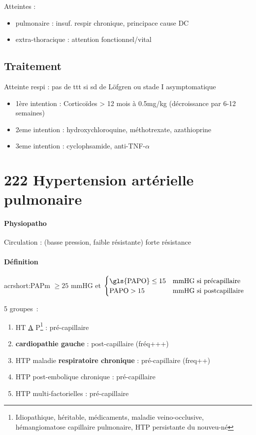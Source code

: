 \documentclass{book}
\begin{document}
Atteintes :

\begin{itemize}
\item pulmonaire : insuf. respir chronique, principace cause DC
\item extra-thoracique : attention fonctionnel/vital
\end{itemize}


\subsection{Traitement}
\label{sec:orge3c5ab7}
\label{sec:orgc05b9f6}
Atteinte respi : pas de ttt si sd de Löfgren ou stade I asymptomatique\\

\begin{itemize}
\item 1ère intention : Corticoïdes > 12 mois à 0.5mg/kg (décroissance par 6-12 semaines)
\item 2eme intention : hydroxychloroquine, méthotrexate, azathioprine
\item 3eme intention : cyclophsamide, anti-TNF-\(\alpha\)
\end{itemize}

\section{222 \textdagger{} Hypertension artérielle pulmonaire}
\label{sec:org100a033}

\paragraph{Physiopatho}
\label{sec:org37656dd}
Circulation : (basse pression, faible résistante) \thus forte résistance

\paragraph{Définition}
\label{sec:org758cb65}
acrshort:PAPm \(\ge 25\) mmHG et
$\begin{cases}
  \text{\gls{PAPO}} \le 15 & \text{mmHG si précapillaire} \\
  \text{PAPO} > 15 & \text{mmHG si postcapillaire}
\end{cases}$

5 groupes :
\begin{enumerate}
\item HT \uline{A} P\footnote{Idiopathique, héritable, médicaments, maladie veino-occlusive, hémangiomatose capillaire
pulmonaire, HTP persistante du nouveu-né} :  pré-capillaire
\item \textbf{cardiopathie gauche}  : post-capillaire (fréq+++)
\item HTP maladie \textbf{respiratoire chronique}  : pré-capillaire (freq++)
\item HTP post-embolique chronique : pré-capillaire
\item HTP multi-factorielles : pré-capillaire
\end{enumerate}
\end{document}
